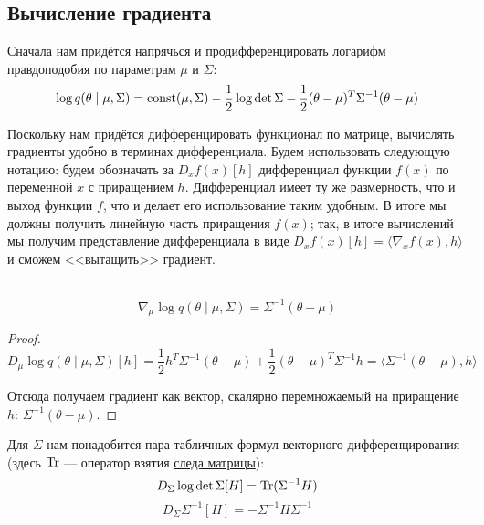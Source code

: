 \subsection{Вычисление градиента}\label{cmaeslikelihoodgrads}

Сначала нам придётся напрячься и продифференцировать логарифм правдоподобия по параметрам $\mu$ и $\Sigma$:
$$\log q(\theta \mid \mu, \Sigma) = \operatorname{const}(\mu, \Sigma) - \frac{1}{2} \log \det \Sigma - \frac{1}{2}(\theta - \mu)^T\Sigma^{-1}(\theta - \mu)$$

Поскольку нам придётся дифференцировать функционал по матрице, вычислять градиенты удобно в терминах дифференциала. Будем использовать следующую нотацию: будем обозначать за $D_x f(x)[h]$ дифференциал функции $f(x)$ по переменной $x$ с приращением $h$. Дифференциал имеет ту же размерность, что и выход функции $f$, что и делает его использование таким удобным. В итоге мы должны получить линейную часть приращения $f(x)$; так, в итоге вычислений мы получим представление дифференциала в виде $D_x f(x)[h] = \langle \nabla_x f(x), h \rangle$ и сможем <<вытащить>> градиент.

\begin{proposition}\,
$$\nabla_\mu \log q(\theta \mid \mu, \Sigma) = \Sigma^{-1}(\theta - \mu)$$
\begin{proof}
$$D_\mu \log q(\theta \mid \mu, \Sigma)[h] = \frac{1}{2}h^T\Sigma^{-1}(\theta - \mu) + \frac{1}{2}(\theta - \mu)^T\Sigma^{-1}h = \langle \Sigma^{-1}(\theta - \mu), h \rangle$$

Отсюда получаем градиент как вектор, скалярно перемножаемый на приращение $h$: $\Sigma^{-1}(\theta - \mu)$.
\end{proof}
\end{proposition}

Для $\Sigma$ нам понадобится пара табличных формул векторного дифференцирования (здесь $\operatorname{Tr}$ --- оператор взятия \href{https://ru.wikipedia.org/wiki/След_матрицы}{следа матрицы}):
\begin{equation}\label{logdetdiff}
D_\Sigma \log \det \Sigma [H] = \operatorname{Tr}(\Sigma^{-1}H)
\end{equation}
\begin{equation}\label{inversediff}
D_\Sigma \Sigma^{-1} [H] = -\Sigma^{-1}H\Sigma^{-1}
\end{equation}


